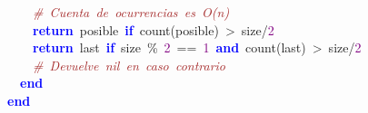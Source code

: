 \mbox{}\ \ \ \ \textit{\textcolor{Brown}{\#\ Cuenta\ de\ ocurrencias\ es\ O(n)}} \\
\mbox{}\ \ \ \ \textbf{\textcolor{Blue}{return}}\ posible\ \textbf{\textcolor{Blue}{if}}\ count\textcolor{BrickRed}{(}posible\textcolor{BrickRed}{)}\ \textcolor{BrickRed}{\textgreater{}}\ size\textcolor{BrickRed}{/}\textcolor{Purple}{2} \\
\mbox{}\ \ \ \ \textbf{\textcolor{Blue}{return}}\ last\ \textbf{\textcolor{Blue}{if}}\ size\ \textcolor{BrickRed}{\%}\ \textcolor{Purple}{2}\ \textcolor{BrickRed}{==}\ \textcolor{Purple}{1}\ \textbf{\textcolor{Blue}{and}}\ count\textcolor{BrickRed}{(}last\textcolor{BrickRed}{)}\ \textcolor{BrickRed}{\textgreater{}}\ size\textcolor{BrickRed}{/}\textcolor{Purple}{2} \\
\mbox{}\ \ \ \ \textit{\textcolor{Brown}{\#\ Devuelve\ nil\ en\ caso\ contrario}} \\
\mbox{}\ \ \textbf{\textcolor{Blue}{end}} \\
\mbox{}\textbf{\textcolor{Blue}{end}} \\
\mbox{} \\